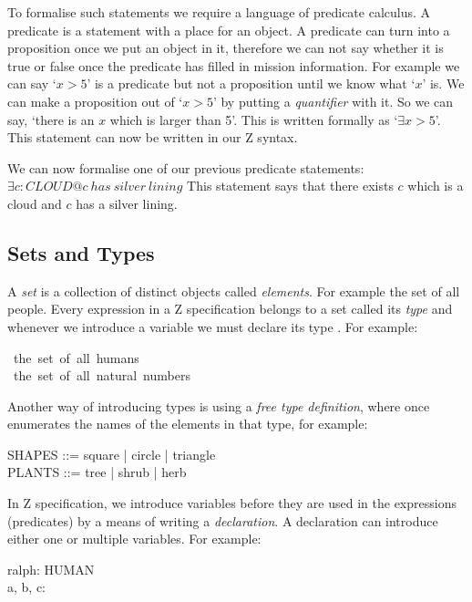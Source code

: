 To formalise such statements we require a language of predicate calculus. A
predicate is a statement with a place for an object. A predicate can turn into a
proposition once we put an object in it, therefore we can not say whether it is
true or false once the predicate has filled in mission information. For example
we can say `$x > 5$' is a predicate but not a proposition until we know what
`$x$' is. We can make a proposition out of `$x > 5$' by putting a
\textit{quantifier} with it. So we can say, `there is an $x$ which is larger
than 5'. This is written formally as `$\exists x > 5$'. This statement can now
be written in our Z syntax.

We can now formalise one of our previous predicate statements:
\newline
$\exists c: CLOUD @ c\ has\ silver\ lining$ This statement says that there
exists $c$ which is a cloud and $c$ has a silver lining.

\subsection{Sets and Types}

A \textit{set} is a collection of distinct objects called \textit{elements}. For
example the set of all people. Every expression in a Z specification belongs to
a set called its \textit{type} and whenever we introduce a variable we must
declare its type \cite{essenceofz}. For example:

\begin{zed}
[HUMAN]\ the\ set\ of\ all\ humans \\
\nat\ the\ set\ of\ all\ natural\ numbers
\end{zed}

Another way of introducing types is using a \textit{free type definition}, where
once enumerates the names of the elements in that type, for example:

\begin{zed}
SHAPES ::= square | circle | triangle \\
PLANTS ::= tree | shrub | herb \\
\end{zed}

In Z specification, we introduce variables before they are used in the
expressions (predicates) by a means of writing a \textit{declaration}. A
declaration can introduce either one or multiple variables. For example:

\begin{zed}
ralph: HUMAN \\
a, b, c: \nat
\end{zed}

